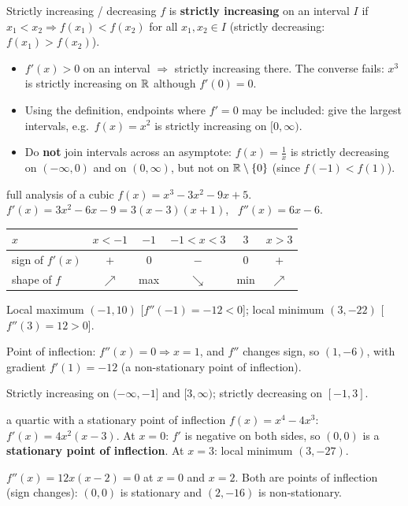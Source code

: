 \begin{defn}{Strictly increasing / decreasing}
$f$ is \textbf{strictly increasing} on an interval $I$ if $x_1<x_2\Rightarrow f(x_1)<f(x_2)$ for all $x_1,x_2\in I$ (strictly decreasing: $f(x_1)>f(x_2)$).
\begin{itemize}
  \item $f'(x)>0$ on an interval $\Rightarrow$ strictly increasing there. The converse fails: $x^3$ is strictly increasing on $\mathbb{R}$ although $f'(0)=0$.
  \item Using the definition, endpoints where $f'=0$ may be included: give the largest intervals, e.g.\ $f(x)=x^2$ is strictly increasing on $[0,\infty)$.
  \item Do \textbf{not} join intervals across an asymptote: $f(x)=\frac1x$ is strictly decreasing on $(-\infty,0)$ and on $(0,\infty)$, but not on $\mathbb{R}\setminus\{0\}$ (since $f(-1)<f(1)$).
\end{itemize}
\end{defn}

\begin{example}{full analysis of a cubic \byhand}
$f(x)=x^3-3x^2-9x+5$. \ $f'(x)=3x^2-6x-9=3(x-3)(x+1)$, \ $f''(x)=6x-6$.\par
\begin{tabular}{@{}l|ccccc@{}}
$x$ & $x<-1$ & $-1$ & $-1<x<3$ & $3$ & $x>3$\\ \hline
sign of $f'(x)$ & $+$ & $0$ & $-$ & $0$ & $+$\\
shape of $f$ & $\nearrow$ & max & $\searrow$ & min & $\nearrow$
\end{tabular}\par
Local maximum $(-1,10)$ [$f''(-1)=-12<0$]; local minimum $(3,-22)$ [$f''(3)=12>0$].\par
Point of inflection: $f''(x)=0\Rightarrow x=1$, and $f''$ changes sign, so $(1,-6)$, with gradient $f'(1)=-12$ (a non-stationary point of inflection).\par
Strictly increasing on $(-\infty,-1]$ and $[3,\infty)$; strictly decreasing on $[-1,3]$.
\end{example}

\begin{example}{a quartic with a stationary point of inflection}
$f(x)=x^4-4x^3$: \ $f'(x)=4x^2(x-3)$. At $x=0$: $f'$ is negative on both sides, so $(0,0)$ is a \textbf{stationary point of inflection}. At $x=3$: local minimum $(3,-27)$.\par
$f''(x)=12x(x-2)=0$ at $x=0$ and $x=2$. Both are points of inflection (sign changes): $(0,0)$ is stationary and $(2,-16)$ is non-stationary.
\end{example}

